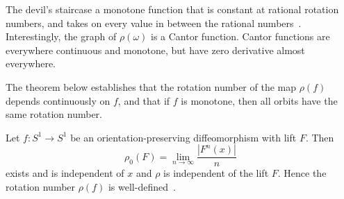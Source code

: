 The devil's staircase a monotone
function that is constant at rational rotation numbers, and takes on
every value in between the rational numbers~\cite{devaney}. Interestingly, the graph of $\rho(\omega)$ is a Cantor
function. Cantor functions are everywhere continuous and monotone, but have zero
derivative almost everywhere. 

The theorem below
establishes that the rotation number of the map $\rho(f)$
depends continuously on $f$, and that if $f$ is monotone, then all
orbits have the same rotation number.

\begin{singlespacing}
\begin{theorem}
Let $f:S^1 \to S^1$ be an orientation-preserving diffeomorphism with
lift $F$. Then
\begin{equation*}
\rho_0(F) = \lim_{n \to \infty} \frac{|F^n(x)|}{n}
\end{equation*}
exists and is independent of $x$ and $\rho$ is independent of the lift $F$. Hence the
rotation number $\rho(f)$ is well-defined~\cite{devaney}.
\end{theorem}
\end{singlespacing}

